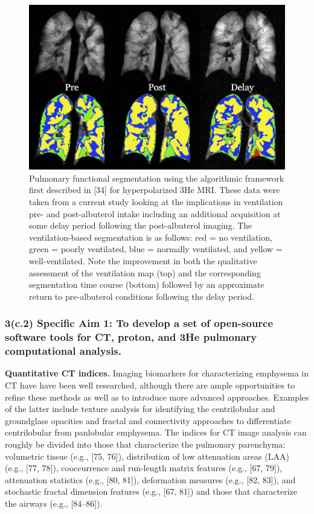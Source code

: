 \documentclass[11pt,]{article}
\begin{document}
\begin{figure}[htbp]
\centering
\includegraphics{Figs/prePostAlbuterol.png}
\caption{Pulmonary functional segmentation using the algorithmic
framework first described in {[}34{]} for hyperpolarized 3He MRI. These
data were taken from a current study looking at the implications in
ventilation pre- and post-albuterol intake including an additional
acquisition at some delay period following the post-albuterol imaging.
The ventilation-based segmentation is as follows: red = no ventilation,
green = poorly ventilated, blue = normally ventilated, and yellow =
well-ventilated. Note the improvement in both the qualitative assessment
of the ventilation map (top) and the corresponding segmentation time
course (bottom) followed by an approximate return to pre-albuterol
conditions following the delay period.}
\end{figure}

\subsubsection{3(c.2) Specific Aim 1: To develop a set of open-source
software tools for CT, proton, and 3He pulmonary computational
analysis.}\label{c.2-specific-aim-1-to-develop-a-set-of-open-source-software-tools-for-ct-proton-and-3he-pulmonary-computational-analysis.}

\textbf{Quantitative CT indices.} Imaging biomarkers for characterizing
emphysema in CT have have been well researched, although there are ample
opportunities to refine these methods as well as to introduce more
advanced approaches. Examples of the latter include texture analysis for
identifying the centrilobular and groundglass opacities and fractal and
connectivity approaches to differentiate centrilobular from panlobular
emphysema. The indices for CT image analysis can roughly be divided into
those that characterize the pulmonary parenchyma: volumetric tissue
(e.g., {[}75, 76{]}), distribution of low attenuation areas (LAA) (e.g.,
{[}77, 78{]}), cooccurrence and run-length matrix features (e.g., {[}67,
79{]}), attenuation statistics (e.g., {[}80, 81{]}), deformation
measures (e.g., {[}82, 83{]}), and stochastic fractal dimension features
(e.g., {[}67, 81{]}) and those that characterize the airways (e.g.,
{[}84--86{]}).
\end{document}
